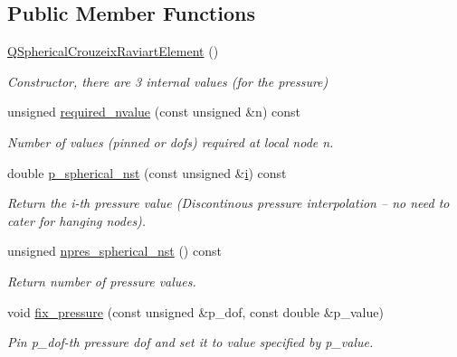 \subsection*{Public Member Functions}
\begin{DoxyCompactItemize}
\item 
\hyperlink{classoomph_1_1QSphericalCrouzeixRaviartElement_aab094422f825d629e91cea28c87284b3}{Q\+Spherical\+Crouzeix\+Raviart\+Element} ()
\begin{DoxyCompactList}\small\item\em Constructor, there are 3 internal values (for the pressure) \end{DoxyCompactList}\item 
unsigned \hyperlink{classoomph_1_1QSphericalCrouzeixRaviartElement_a75ba69f53af20c9f240856d105bc12ea}{required\+\_\+nvalue} (const unsigned \&n) const
\begin{DoxyCompactList}\small\item\em Number of values (pinned or dofs) required at local node n. \end{DoxyCompactList}\item 
double \hyperlink{classoomph_1_1QSphericalCrouzeixRaviartElement_a793d90652542ffffade39aaf25f9cc4c}{p\+\_\+spherical\+\_\+nst} (const unsigned \&\hyperlink{cfortran_8h_adb50e893b86b3e55e751a42eab3cba82}{i}) const
\begin{DoxyCompactList}\small\item\em Return the i-\/th pressure value (Discontinous pressure interpolation -- no need to cater for hanging nodes). \end{DoxyCompactList}\item 
unsigned \hyperlink{classoomph_1_1QSphericalCrouzeixRaviartElement_adefc160b9cedb7638a265e4c37f2e237}{npres\+\_\+spherical\+\_\+nst} () const
\begin{DoxyCompactList}\small\item\em Return number of pressure values. \end{DoxyCompactList}\item 
void \hyperlink{classoomph_1_1QSphericalCrouzeixRaviartElement_a61feca031056f09a70e1d9901d20b58b}{fix\+\_\+pressure} (const unsigned \&p\+\_\+dof, const double \&p\+\_\+value)
\begin{DoxyCompactList}\small\item\em Pin p\+\_\+dof-\/th pressure dof and set it to value specified by p\+\_\+value. \end{DoxyCompactList}\item 

\end{DoxyCompactItemize}
